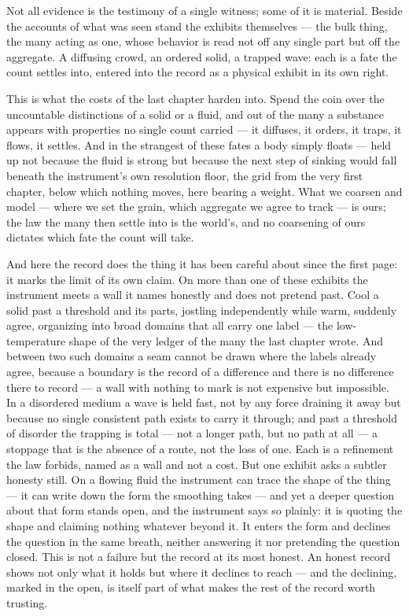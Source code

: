 \noindent Not all evidence is the testimony of a single witness; some of it is material. Beside the accounts of
what was seen stand the exhibits themselves --- the bulk thing, the many acting as one, whose behavior is read
not off any single part but off the aggregate. A diffusing crowd, an ordered solid, a trapped wave: each is a
fate the count settles into, entered into the record as a physical exhibit in its own right.

This is what the costs of the last chapter harden into. Spend the coin over the uncountable distinctions of a
solid or a fluid, and out of the many a substance appears with properties no single count carried --- it
diffuses, it orders, it traps, it flows, it settles. And in the strangest of these fates a body simply floats
--- held up not because the fluid is strong but because the next step of sinking would fall beneath the
instrument's own resolution floor, the grid from the very first chapter, below which nothing moves, here bearing
a weight. What we coarsen and model --- where we set the grain, which aggregate we agree to track --- is ours;
the law the many then settle into is the world's, and no coarsening of ours dictates which fate the count will
take.

And here the record does the thing it has been careful about since the first page: it marks the limit of its own
claim. On more than one of these exhibits the instrument meets a wall it names honestly and does not pretend
past. Cool a solid past a threshold and its parts, jostling
independently while warm, suddenly agree, organizing into broad domains that all carry one label --- the
low-temperature shape of the very ledger of the many the last chapter wrote. And between two such domains a seam
cannot be drawn where the labels already agree, because a boundary is the record of a difference and there is no
difference there to record --- a wall with nothing to mark is not expensive but impossible. In a disordered
medium a wave is held fast, not by any force draining it away but because no single consistent path exists to
carry it through; and past a threshold of disorder the trapping is total --- not a longer path, but no path at
all --- a stoppage that is the absence of a route, not the loss of one. Each is a refinement the law forbids, named as a wall and not a cost. But one exhibit asks a
subtler honesty still. On a flowing fluid the instrument can trace the shape of the thing --- it can write down
the form the smoothing takes --- and yet a deeper question about that form stands open, and the instrument says
so plainly: it is quoting the shape and claiming nothing whatever beyond it. It enters the form and declines the
question in the same breath, neither answering it nor pretending the question closed. This is not a failure but
the record at its most honest. An honest record shows not only what it holds but where it declines to reach ---
and the declining, marked in the open, is itself part of what makes the rest of the record worth trusting.

